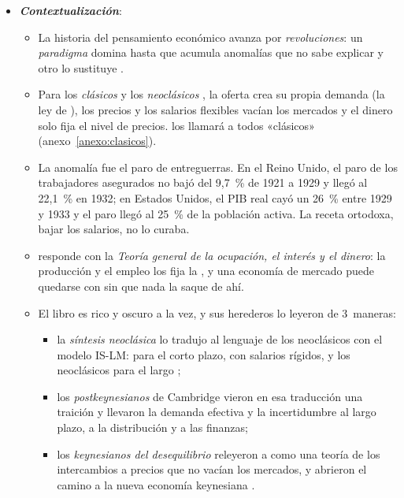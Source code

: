 \documentclass[11pt]{article}
\begin{document}
\begin{itemize}
\item \textbf{\emph{Contextualización}}:
  \begin{itemize}
  \item La historia del pensamiento económico avanza por \emph{revoluciones}: un \emph{paradigma} domina hasta que acumula anomalías que no sabe explicar y otro lo sustituye\nocite{Kuhn1962Structure} .
  \item Para los \emph{clásicos}  y los \emph{neoclásicos} , la oferta crea su propia demanda (la ley de ), los precios y los salarios flexibles vacían los mercados y el dinero solo fija el nivel de precios.  los llamará a todos «clásicos» (anexo~\ref{anexo:clasicos}).
  \item La anomalía fue el paro de entreguerras. En el Reino Unido, el paro de los trabajadores asegurados no bajó del 9,7~\% de 1921 a 1929 y llegó al 22,1~\% en 1932\nocite{BoE2017Millennium}; en Estados Unidos, el PIB real cayó un 26~\% entre 1929 y 1933\nocite{BEA2026NIPA} y el paro llegó al 25~\% de la población activa\nocite{Census1975HSUS}. La receta ortodoxa, bajar los salarios, no lo curaba.
  \item \textcite{Keynes1936} responde con la \emph{Teoría general de la ocupación, el interés y el dinero}: la producción y el empleo los fija la , y una economía de mercado puede quedarse con  sin que nada la saque de ahí.
  \item El libro es rico y oscuro a la vez, y sus herederos lo leyeron de 3~maneras:
    \begin{itemize}
    \item la \emph{síntesis neoclásica} lo tradujo al lenguaje de los neoclásicos con el modelo IS-LM:  para el corto plazo, con salarios rígidos, y los neoclásicos para el largo ;
    \item los \emph{postkeynesianos} de Cambridge vieron en esa traducción una traición y llevaron la demanda efectiva y la incertidumbre al largo plazo, a la distribución y a las finanzas;
    \item los \emph{keynesianos del desequilibrio} releyeron a  como una teoría de los intercambios a precios que no vacían los mercados, y abrieron el camino a la nueva economía keynesiana .
    \end{itemize}
  \end{itemize}


\end{itemize}
\end{document}
